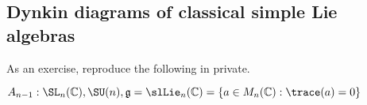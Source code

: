 \documentclass[reqno]{amsart} 
\begin{document}
\subsection{Dynkin diagrams of classical simple Lie algebras\label{sec:dynkin-diagrams-classical-examples}}
\label{sec:orga54764a}
\newcommand{\dynkinradius}{.04cm} \newcommand{\dynkinstep}{.35cm} \newcommand{\dynkindot}[2]{\fill (\dynkinstep*#1,\dynkinstep*#2) circle (\dynkinradius);} \newcommand{\dynkinXsize}{1.5} \newcommand{\dynkincross}[2]{ \draw[thick] (#1*\dynkinstep-\dynkinXsize,#2*\dynkinstep-\dynkinXsize) -- (#1*\dynkinstep+\dynkinXsize,#2*\dynkinstep+\dynkinXsize); \draw[thick] (#1*\dynkinstep-\dynkinXsize,#2*\dynkinstep+\dynkinXsize) -- (#1*\dynkinstep+\dynkinXsize,#2*\dynkinstep-\dynkinXsize); } \newcommand{\dynkinline}[4]{\draw[thin] (\dynkinstep*#1,\dynkinstep*#2) -- (\dynkinstep*#3,\dynkinstep*#4);} \newcommand{\dynkindots}[4]{\draw[dotted] (\dynkinstep*#1,\dynkinstep*#2) -- (\dynkinstep*#3,\dynkinstep*#4);} \newcommand{\dynkindoubleline}[4]{\draw[double,postaction={decorate}] (\dynkinstep*#1,\dynkinstep*#2) -- (\dynkinstep*#3,\dynkinstep*#4);}

\newenvironment{dynkin}{
\begin{tikzpicture}
[decoration={markings,mark=at position 0.7 with {\arrow{>}}}]} {
\end{tikzpicture}
} As an exercise, reproduce the following in private.

$A_{n-1} : \SL_{n}(\mathbb{C}), \SU(n), \mathfrak{g} = \slLie_{n}(\mathbb{C}) = \{a \in M_n(\mathbb{C}): \trace(a) = 0\}$
\end{document}

